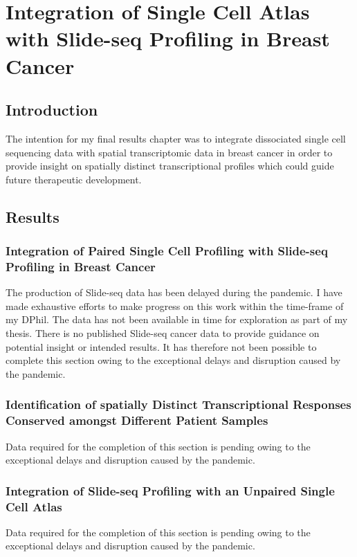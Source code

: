 \chapter{\label{ch:5}Integration of Single Cell Atlas with Slide-seq Profiling in Breast Cancer}

\section{Introduction}
The intention for my final results chapter was to integrate dissociated single cell sequencing data with spatial transcriptomic data in breast cancer in order to provide insight on spatially distinct transcriptional profiles which could guide future therapeutic development.


\section{Results}

\subsection{Integration of Paired Single Cell Profiling with Slide-seq Profiling in Breast Cancer}
The production of Slide-seq data has been delayed during the pandemic. I have made exhaustive efforts to make progress on this work within the time-frame of my DPhil. The data has not been available in time for exploration as part of my thesis. There is no published Slide-seq cancer data to provide guidance on potential insight or intended results. It has therefore not been possible to complete this section owing to the exceptional delays and disruption caused by the pandemic. 

\subsection{Identification of spatially Distinct Transcriptional Responses Conserved amongst Different Patient Samples}
Data required for the completion of this section is pending owing to the exceptional delays and disruption caused by the pandemic. 

\subsection{Integration of Slide-seq Profiling with an Unpaired Single Cell Atlas}
Data required for the completion of this section is pending owing to the exceptional delays and disruption caused by the pandemic. 

